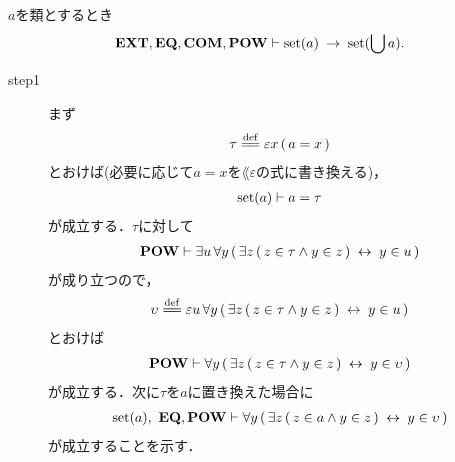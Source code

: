 	\begin{screen}
		\begin{thm}[集合の合併は集合]
		\label{thm:union_of_a_set_is_a_set}
			$a$を類とするとき
			\begin{align}
				\mbox{{\bf EXT}},\mbox{{\bf EQ}},\mbox{\bf COM},\mbox{{\bf POW}} \vdash \operatorname*{set} (a) \hspace{0.25em}\rightarrow\hspace{0.25em} \operatorname*{set} (\bigcup a).
			\end{align}
		\end{thm}
	\end{screen}
	
	\begin{sketch}\mbox{}
		\begin{description}
			\item[step1]
				まず
				\begin{align}
					\tau \defeq \varepsilon x\, (\, a = x\, )
				\end{align}
				とおけば(必要に応じて$a = x$を$\lang{\varepsilon}$の式に書き換える)，
				\begin{align}
					\operatorname*{set} (a) \vdash a = \tau
				\end{align}
				が成立する．$\tau$に対して
				\begin{align}
					\mbox{{\bf POW}} \vdash \exists u\, \forall y\, (\, \exists z\, (\, z \in \tau \wedge y \in z\, ) \hspace{0.25em}\leftrightarrow\hspace{0.25em} y \in u\, )
				\end{align}
				が成り立つので，
				\begin{align}
					\upsilon \defeq \varepsilon u\, \forall y\, (\, \exists z\, (\, z \in \tau \wedge y \in z\, ) \lrarrow y \in u\, )
				\end{align}
				とおけば
				\begin{align}
					\mbox{{\bf POW}} \vdash \forall y\, (\, \exists z\, (\, z \in \tau \wedge y \in z\, ) \hspace{0.25em}\leftrightarrow\hspace{0.25em} y \in \upsilon\, )
					\label{fom:union_of_a_set_is_a_set_1}
				\end{align}
				が成立する．次に$\tau$を$a$に置き換えた場合に
				\begin{align}
					\operatorname*{set} (a),\ \mbox{{\bf EQ}},\mbox{{\bf POW}} \vdash \forall y\, (\, \exists z\, (\, z \in a \wedge y \in z\, ) \hspace{0.25em}\leftrightarrow\hspace{0.25em} y \in \upsilon\, )
				\end{align}
				が成立することを示す．
				

\end{description}
\end{sketch}
